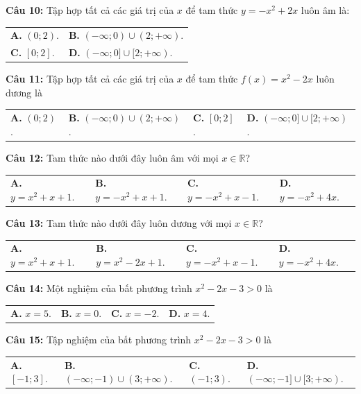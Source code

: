 \documentclass[12pt,a4paper]{extarticle}
\begin{document}
\noindent\textbf{Câu 10:} Tập hợp tất cả các giá trị của $x$ để tam thức $y=-x^2+2x$ luôn âm là:
\begin{center}
\begin{tabular}{p{7.5cm} p{7.5cm}}
\textbf{A.} $(0;2)$. & \textbf{B.} $(-\infty;0) \cup (2;+\infty)$. \\
\textbf{C.} $[0;2]$. & \textbf{D.} $(-\infty;0] \cup [2;+\infty)$.
\end{tabular}
\end{center}
\noindent\textbf{Câu 11:} Tập hợp tất cả các giá trị của $x$ để tam thức $f(x)=x^2-2x$ luôn dương là
\begin{center}
\begin{tabular}{p{3.5cm} p{3.5cm} p{3.5cm} p{3.5cm}}
\textbf{A.} $(0;2)$. & \textbf{B.} $(-\infty;0) \cup (2;+\infty)$. & \textbf{C.} $[0;2]$. & \textbf{D.} $(-\infty;0] \cup [2;+\infty)$.
\end{tabular}
\end{center}
\noindent\textbf{Câu 12:} Tam thức nào dưới đây luôn âm với mọi $x \in \mathbb{R}$?
\begin{center}
\begin{tabular}{p{3.5cm} p{3.5cm} p{3.5cm} p{3.5cm}}
\textbf{A.} $y=x^2+x+1$. & \textbf{B.} $y=-x^2+x+1$. & \textbf{C.} $y=-x^2+x-1$. & \textbf{D.} $y=-x^2+4x$.
\end{tabular}
\end{center}
\noindent\textbf{Câu 13:} Tam thức nào dưới đây luôn dương với mọi $x \in \mathbb{R}$?
\begin{center}
\begin{tabular}{p{3.5cm} p{3.5cm} p{3.5cm} p{3.5cm}}
\textbf{A.} $y=x^2+x+1$. & \textbf{B.} $y=x^2-2x+1$. & \textbf{C.} $y=-x^2+x-1$. & \textbf{D.} $y=-x^2+4x$.
\end{tabular}
\end{center}
\noindent\textbf{Câu 14:} Một nghiệm của bất phương trình $x^2-2x-3>0$ là
\begin{center}
\begin{tabular}{p{3.5cm} p{3.5cm} p{3.5cm} p{3.5cm}}
\textbf{A.} $x=5$. & \textbf{B.} $x=0$. & \textbf{C.} $x=-2$. & \textbf{D.} $x=4$.
\end{tabular}
\end{center}
\noindent\textbf{Câu 15:} Tập nghiệm của bất phương trình $x^2-2x-3>0$ là
\begin{center}
\begin{tabular}{p{3.5cm} p{3.5cm} p{3.5cm} p{3.5cm}}
\textbf{A.} $[-1;3]$. & \textbf{B.} $(-\infty;-1) \cup (3;+\infty)$. & \textbf{C.} $(-1;3)$. & \textbf{D.} $(-\infty;-1] \cup [3;+\infty)$.
\end{tabular}
\end{center}
\end{document}
